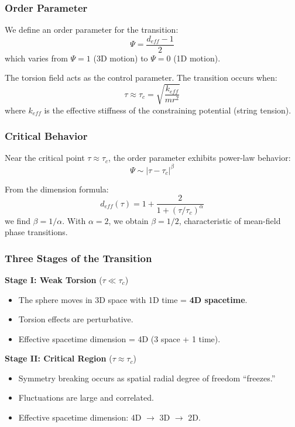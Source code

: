 \documentclass[12pt,a4paper]{article}
\begin{document}
\subsubsection{Order Parameter}

We define an order parameter for the transition:
\begin{equation}
    \Psi = \frac{d_{eff} - 1}{2}
\end{equation}
which varies from $\Psi = 1$ (3D motion) to $\Psi = 0$ (1D motion).

The torsion field acts as the control parameter. The transition occurs when:
\begin{equation}
    \tau \approx \tau_c = \sqrt{\frac{k_{eff}}{mr^2}}
\end{equation}
where $k_{eff}$ is the effective stiffness of the constraining potential (string tension).

\subsubsection{Critical Behavior}

Near the critical point $\tau \approx \tau_c$, the order parameter exhibits power-law behavior:
\begin{equation}
    \Psi \sim |\tau - \tau_c|^\beta
\end{equation}

From the dimension formula:
\begin{equation}
    d_{eff}(\tau) = 1 + \frac{2}{1+(\tau/\tau_c)^\alpha}
\end{equation}
we find $\beta = 1/\alpha$. With $\alpha = 2$, we obtain $\beta = 1/2$, characteristic of mean-field phase transitions.

\subsubsection{Three Stages of the Transition}

\textbf{Stage I: Weak Torsion} ($\tau \ll \tau_c$)
\begin{itemize}
    \item The sphere moves in 3D space with 1D time = \textbf{4D spacetime}.
    \item Torsion effects are perturbative.
    \item Effective spacetime dimension = 4D (3 space + 1 time).
\end{itemize}

\textbf{Stage II: Critical Region} ($\tau \approx \tau_c$)
\begin{itemize}
    \item Symmetry breaking occurs as spatial radial degree of freedom ``freezes.''
    \item Fluctuations are large and correlated.
    \item Effective spacetime dimension: 4D $\to$ 3D $\to$ 2D.
\end{itemize}
\end{document}
